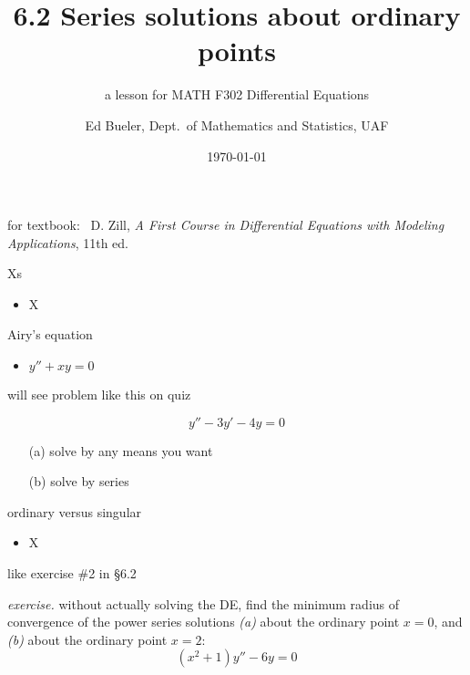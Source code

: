 \documentclass[urlcolor=blue,dvipsnames]{beamer}
\title{6.2 Series solutions about ordinary points}
\subtitle{a lesson for MATH F302 Differential Equations}
\author{Ed Bueler, Dept.~of Mathematics and Statistics, UAF}
\date{\tiny \today}
\begin{document}


\begin{frame}
\titlepage

\centerline{\tiny for textbook: \, D. Zill, \emph{A First Course in Differential Equations with Modeling Applications}, 11th ed.}
\end{frame}


\begin{frame}{Xs}

\begin{itemize}
\item X
\end{itemize}
\end{frame}


\begin{frame}{Airy's equation}

\begin{itemize}
\item $y''+xy=0$
\end{itemize}
\end{frame}


\begin{frame}{will see problem like this on quiz}

$$y''-3y'-4y=0$$

\begin{itemize}
\item[(a)] solve by any means you want
\item[(b)] solve by series
\end{itemize}
\end{frame}


\begin{frame}{ordinary versus singular}

\begin{itemize}
\item X
\end{itemize}
\end{frame}


\begin{frame}{like exercise \#2 in \S 6.2}

\noindent \emph{exercise.}  without actually solving the DE, find the minimum radius of convergence of the power series solutions \emph{(a)} about the ordinary point $x=0$, and \emph{(b)} about the ordinary point $x=2$:
    $$(x^2+1) y'' - 6 y = 0$$

\vspace{50mm}
\end{frame}
\end{document}

